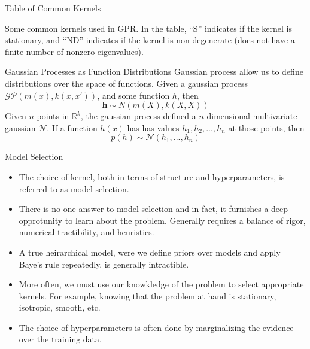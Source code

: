 \documentclass[10pt]{beamer}
\begin{document}
\begin{frame}{Table of Common Kernels}
  \begin{center}
  \end{center}
  \begin{center}
    Some common kernels used in GPR. In the table, ``S'' indicates if the kernel is stationary, and ``ND'' indicates if the kernel is non-degenerate (does not have a finite number of nonzero eigenvalues).
  \end{center}
\end{frame}

\begin{frame}{Gaussian Processes as Function Distributions}
  Gaussian process allow us to define distributions over the space of functions. Given a gaussian process $\mathcal{GP} \left( m(x) , k(x,x') \right)$, and some function $h$, then
  \begin{equation}
    \mathbf{h} \sim N(m(X) , k(X,X))
  \end{equation}
  Given $n$ points in $\mathbb{R}^{k}$, the gaussian process defined a $n$ dimensional multivariate gaussian $\mathcal{N}$. If a function $h(x)$ has has values $h_1,h_2,...,h_{n}$ at those points, then
  \begin{equation}
    p \left( h \right) \sim \mathcal{N}(h_{1}, ..., h_{n})
  \end{equation}

  \begin{center}
  \end{center}
\end{frame}

\begin{frame}{Model Selection}
  \begin{itemize}
  \item The choice of kernel, both in terms of structure and hyperparameters, is referred to as model selection. 
  \item There is no one answer to model selection and in fact, it furnishes a deep opprotunity to learn about the problem.
    Generally requires a balance of rigor, numerical tractibility, and heuristics.  
  \item A true heirarchical model, were we define priors over models and apply Baye's rule repeatedly, is generally intractible.
  \item More often, we must use our knowkledge of the problem to select appropriate kernels. For example, knowing that the problem at hand is stationary, isotropic, smooth, etc. 
  \item The choice of hyperparameters is often done by marginalizing the evidence over the training data.
  \end{itemize}
\end{frame}
\end{document}
